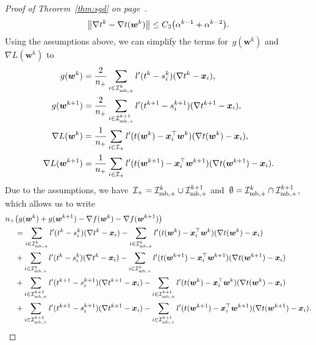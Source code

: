 \begin{proof}[Proof of Theorem~\ref{thm:sgd} on page~\pageref{thm:sgd}]
  \begin{equation}\label{eq:sgd_nablat_diff}
    \norm{\nabla t^k - \nabla t(\bm{w}^k)} \le C_3\Brac{\alpha^{k-1} + \alpha^{k-2}}.
  \end{equation}
  Using the assumptions above, we can simplify the terms for~$g(\bm{w}^k)$ and~$\nabla L(\bm{w}^k)$ to
  \begin{equation*}
    \begin{aligned}
      g(\bm{w}^k)
        & = \frac{2}{n_{+}} \sum_{i \in \mathcal{I}_{\text{mb},+}^k} l'(t^k - s_i^k)(\nabla t^k - \bm{x}_i), \\
      g(\bm{w}^{k+1})
        & = \frac{2}{n_{+}} \sum_{i \in \mathcal{I}_{\text{mb},+}^{k+1}} l'(t^{k+1}-s_i^{k+1})(\nabla t^{k+1} - \bm{x}_i), \\
      \nabla L(\bm{w}^k)
        & = \frac{1}{n_{+}} \sum_{i \in \mathcal{I}_{+}} l'(t(\bm{w}^k) - \bm{x}_i^\top \bm{w}^k)(\nabla t(\bm{w}^k) - \bm{x}_i), \\
      \nabla L(\bm{w}^{k+1})
        & = \frac{1}{n_{+}} \sum_{i \in \mathcal{I}_{+}} l'(t(\bm{w}^{k+1}) - \bm{x}_i^\top \bm{w}^{k+1})(\nabla t(\bm{w}^{k+1}) - \bm{x}_i).
    \end{aligned}
  \end{equation*}
  Due to the assumptions, we have~$\mathcal{I}_{+} = \mathcal{I}_{\text{mb},+}^k \cup \mathcal{I}_{\text{mb},+}^{k+1}$ and~$\emptyset = \mathcal{I}_{\text{mb},+}^k \cap \mathcal{I}_{\text{mb},+}^{k+1}$, which allows us to write
  \begin{subequations}\label{eq:sgd_sum}
    \begin{align}
    \label{eq:sgd_sum1}
    \npos & \Brac{g(\bm{w}^k) + g(\bm{w}^{k+1}) - \nabla f(\bm{w}^k)-\nabla f(\bm{w}^{k+1})}\\
    \label{eq:sgd_sum2}
    & = \sum_{i \in \Imbpos^k} l'(t^k - s_i^k)(\nabla t^k - \bm{x}_i) - \sum_{i \in \Imbpos^k} l'(t(\bm{w}^k) - \bm{x}_i^\top \bm{w}^k)(\nabla t(\bm{w}^k) - \bm{x}_i) \\
    \label{eq:sgd_sum3}
    & + \sum_{i \in \Imbpos^k} l'(t^k - s_i^k)(\nabla t^k - \bm{x}_i) - \sum_{i \in \Imbpos^k} l'(t(\bm{w}^{k+1}) - \bm{x}_i^\top \bm{w}^{k+1})(\nabla t(\bm{w}^{k+1}) - \bm{x}_i)\\
    \label{eq:sgd_sum4}
    & + \sum_{i \in \Imbpos^{k+1}} l'(t^{k+1} - s_i^{k+1})(\nabla t^{k+1} - \bm{x}_i) - \sum_{i\in \Imbpos^{k+1}}l'(t(\bm{w}^k) - \bm{x}_i^\top \bm{w}^k)(\nabla t(\bm{w}^k) - \bm{x}_i) \\
    \label{eq:sgd_sum5}
    & + \sum_{i \in \Imbpos^{k+1}} l'(t^{k+1} - s_i^{k+1})(\nabla t^{k+1} - \bm{x}_i)  - \sum_{i \in \Imbpos^{k+1}} l'(t(\bm{w}^{k+1}) - \bm{x}_i^\top \bm{w}^{k+1})(\nabla t(\bm{w}^{k+1}) - \bm{x}_i).

\end{align}
\end{subequations}
\end{proof}

